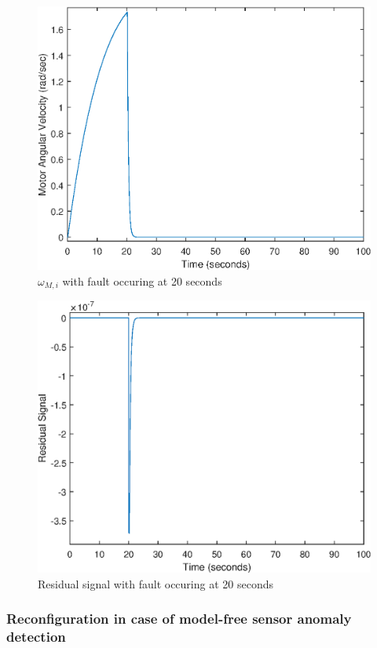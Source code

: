 \begin{figure}
	\centering
	\includegraphics[width=120mm]{figures/omega_reconfig}
	\caption{$\omega_{M,i}$ with fault occuring at 20 seconds}
\end{figure} 


\begin{figure}
	\centering
	\includegraphics[width=120mm]{figures/residual_reconfig}
	\caption{Residual signal with fault occuring at 20 seconds}
\end{figure} 

\subsubsection{Reconfiguration in case of model-free sensor anomaly detection}

